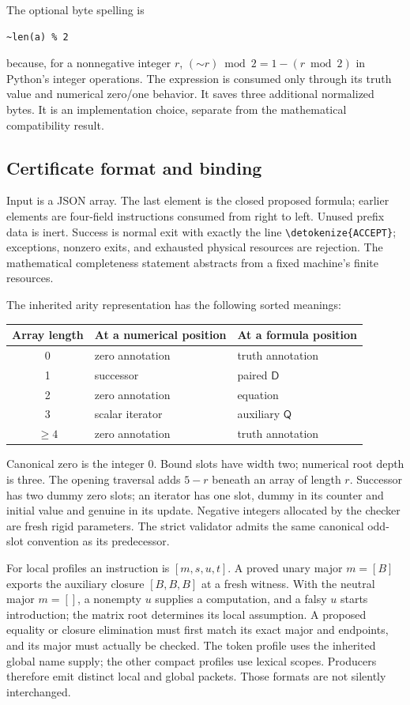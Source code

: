 \documentclass[11pt,letterpaper]{article}
\theoremstyle{definition}\newtheorem{definition}[theorem]{Definition}
\theoremstyle{remark}\newtheorem{remark}[theorem]{Remark}
\newcommand{\D}{\mathsf D}
\newcommand{\Q}{\mathsf Q}
\newcommand{\file}[1]{\expandafter\nolinkurl\expandafter{\detokenize{#1}}}
\begin{document}
The optional byte spelling is
\begin{lstlisting}
~len(a) % 2
\end{lstlisting}
because, for a nonnegative integer $r$,
$(\mathord\sim r)\bmod2=1-(r\bmod2)$ in Python's integer operations.
The expression is consumed only through its truth value and numerical
zero/one behavior. It saves three additional normalized bytes. It is an
implementation choice, separate from the mathematical compatibility result.

\subsection{Certificate format and binding}

Input is a JSON array. The last element is the closed proposed formula;
earlier elements are four-field instructions consumed from right to left.
Unused prefix data is inert. Success is normal exit with exactly the line
\file{ACCEPT}; exceptions, nonzero exits, and exhausted physical resources
are rejection. The mathematical completeness statement abstracts from a
fixed machine's finite resources.

The inherited arity representation has the following sorted meanings:
\begin{center}\small
\begin{tabular}{cll}
\toprule
Array length & At a numerical position & At a formula position\\
\midrule
0 & zero annotation & truth annotation\\
1 & successor & paired $\D$\\
2 & zero annotation & equation\\
3 & scalar iterator & auxiliary $\Q$\\
$\geq4$ & zero annotation & truth annotation\\
\bottomrule
\end{tabular}
\end{center}
Canonical zero is the integer $0$. Bound slots have width two; numerical
root depth is three. The opening traversal adds $5-r$ beneath an array of
length $r$. Successor has two dummy zero slots; an iterator has one slot,
dummy in its counter and initial value and genuine in its update. Negative
integers allocated by the checker are fresh rigid parameters. The strict
validator admits the same canonical odd-slot convention as its predecessor.

For local profiles an instruction is $[m,s,u,t]$. A proved unary major
$m=[B]$ exports the auxiliary closure $[B,B,B]$ at a fresh witness. With
the neutral major $m=[]$, a nonempty $u$ supplies a computation, and a
falsy $u$ starts introduction; the matrix root determines its local
assumption. A proposed equality or closure elimination must first match
its exact major and endpoints, and its major must actually be checked.
The token profile uses the inherited global name supply; the other compact
profiles use lexical scopes. Producers therefore emit distinct local and
global packets. Those formats are not silently interchanged.
\end{document}
